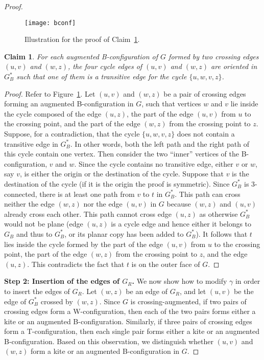 \documentclass{article}
\newtheorem{claim}{Claim}
\begin{document}
\begin{proof}
\begin{figure}[t]
    \centering
    \texttt{[image: bconf]}
    \caption{Illustration for the proof of Claim~\ref{cl:bconf}.\label{fi:transitive}}
\end{figure}


\begin{claim}\label{cl:bconf}
For each augmented B-configuration of $G$ formed by two crossing edges $(u,v)$ and $(w,z)$, the four cycle edges of $(u,v)$ and $(w,z)$ are oriented in $G_B^*$ such that one of them is a transitive edge for the cycle  $\{u,w,v,z\}$.
\end{claim}
\begin{proof}
Refer to Figure~\ref{fi:transitive}. Let $(u,v)$ and $(w,z)$ be a pair of crossing edges forming an augmented B-configuration in $G$, such that vertices $w$ and $v$ lie inside the cycle composed of the edge $(u,z)$, the part of the edge $(u,v)$ from $u$ to the crossing point, and the part of the edge $(w,z)$ from the crossing point to $z$. Suppose, for a contradiction, that the cycle $\{u,w,v,z\}$ does not contain a transitive edge in $G^*_B$. In other words, both the left path and the right path of this cycle contain one vertex. Then consider the two ``inner'' vertices of the B-configuration, $v$ and $w$. Since the  cycle contains no transitive edge, either $v$ or $w$, say $v$, is either the origin or the destination of the cycle. Suppose that $v$ is the destination of the cycle (if it is the origin the proof is symmetric). Since $G^*_B$ is 3-connected, there is at least one path from $v$ to $t$ in $G^*_B$. This path can cross neither the edge $(w,z)$ nor the edge $(u,v)$ in $G$ because $(w,z)$ and $(u,v)$ already cross each other. This path cannot cross edge $(u,z)$ as otherwise $G^*_B$ would not be plane (edge $(u,z)$ is a cycle edge and hence either it belongs to $G_B$ and thus to $G^*_B$, or its planar copy has been added to $G^*_B$). It follows that $t$ lies inside the cycle formed by the part of the edge $(u,v)$ from $u$ to the crossing point, the part of the edge $(w,z)$ from the crossing point to $z$, and the edge $(u,z)$. This contradicts the fact that $t$ is on the outer face of $G$.
\end{proof}

\smallskip\noindent\textbf{Step 2: Insertion of the edges of $G_R$.} We now show how to modify $\gamma$ in order to insert the edges of $G_R$. Let $(w,z)$ be an edge of $G_R$, and let $(u,v)$ be the edge of $G^*_B$ crossed by $(w,z)$. Since $G$ is crossing-augmented, if two pairs of crossing edges form a W-configuration, then each of the two pairs forms either a kite or an augmented B-configuration. Similarly, if three pairs of crossing edges form a T-configuration, then each single pair forms either a kite or an augmented B-configuration. Based on this observation, we distinguish whether $(u,v)$ and $(w,z)$ form a kite or an augmented B-configuration in $G$. 



\end{proof}
\end{document}
